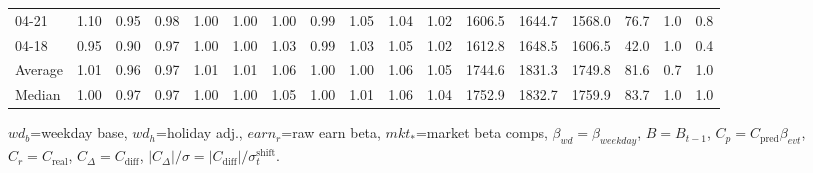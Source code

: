 \begin{threeparttable}
{\begin{tabular}{lrrrrrrrrrrrrrrrr}
  04-21 &   1.10 &   0.95 &         0.98 &     1.00 &           1.00 &        1.00 &        0.99 &        1.05 &          1.04 &          1.02 & 1606.5 & 1644.7 & 1568.0 &       76.7 &                      1.0 &                 0.8 \\
  04-18 &   0.95 &   0.90 &         0.97 &     1.00 &           1.00 &        1.03 &        0.99 &        1.03 &          1.05 &          1.02 & 1612.8 & 1648.5 & 1606.5 &       42.0 &                      1.0 &                 0.4 \\
Average &   1.01 &   0.96 &         0.97 &     1.01 &           1.01 &        1.06 &        1.00 &        1.00 &          1.06 &          1.05 & 1744.6 & 1831.3 & 1749.8 &       81.6 &                      0.7 &                 1.0 \\
 Median &   1.00 &   0.97 &         0.97 &     1.00 &           1.00 &        1.05 &        1.00 &        1.01 &          1.06 &          1.04 & 1752.9 & 1832.7 & 1759.9 &       83.7 &                      1.0 &                 1.0 \\
\bottomrule
\end{tabular}
}
\begin{tablenotes}\footnotesize
\item $wd_b$=weekday base, $wd_h$=holiday adj.,
$earn_r$=raw earn beta, $mkt_{*}$=market beta comps,
$\beta_{wd}=\beta_{weekday}$, $B=B_{t-1}$,
$C_p=C_{\text{pred}}\beta_{evt}$, $C_r=C_{\text{real}}$,
$C_\Delta=C_{\text{diff}}$, $|C_\Delta|/\sigma=|C_{\text{diff}}|/\sigma_t^{\text{shift}}$.
\end{tablenotes}
\end{threeparttable}
\endgroup
